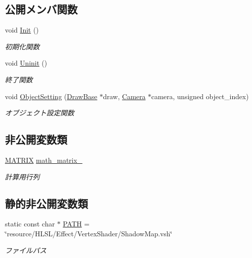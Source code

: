\subsection*{公開メンバ関数}
\begin{DoxyCompactItemize}
\item 
void \mbox{\hyperlink{class_vertex_shader_shadow_map_ad05ff60e979b3d2af8603a118cb51185}{Init}} ()
\begin{DoxyCompactList}\small\item\em 初期化関数 \end{DoxyCompactList}\item 
void \mbox{\hyperlink{class_vertex_shader_shadow_map_a5b36c3531d6116c609c8a62bc4ffd95d}{Uninit}} ()
\begin{DoxyCompactList}\small\item\em 終了関数 \end{DoxyCompactList}\item 
void \mbox{\hyperlink{class_vertex_shader_shadow_map_a49f6120c2ca0200ca4d8bcb05cfae4d8}{Object\+Setting}} (\mbox{\hyperlink{class_draw_base}{Draw\+Base}} $\ast$draw, \mbox{\hyperlink{class_camera}{Camera}} $\ast$camera, unsigned object\+\_\+index)
\begin{DoxyCompactList}\small\item\em オブジェクト設定関数 \end{DoxyCompactList}\end{DoxyCompactItemize}
\subsection*{非公開変数類}
\begin{DoxyCompactItemize}
\item 
\mbox{\hyperlink{_matrix_8h_a032295cd9fb1b711757c90667278e744}{M\+A\+T\+R\+IX}} \mbox{\hyperlink{class_vertex_shader_shadow_map_a5b3069ce052a5de3e19ea578d8bdb950}{math\+\_\+matrix\+\_\+}}
\begin{DoxyCompactList}\small\item\em 計算用行列 \end{DoxyCompactList}\end{DoxyCompactItemize}
\subsection*{静的非公開変数類}
\begin{DoxyCompactItemize}
\item 
static const char $\ast$ \mbox{\hyperlink{class_vertex_shader_shadow_map_a3520e12e1b04f87f1f8e2c90e637e8d0}{P\+A\+TH}} = \char`\"{}resource/H\+L\+SL/Effect/Vertex\+Shader/Shadow\+Map.\+vsh\char`\"{}
\begin{DoxyCompactList}\small\item\em ファイルパス \end{DoxyCompactList}\end{DoxyCompactItemize}
